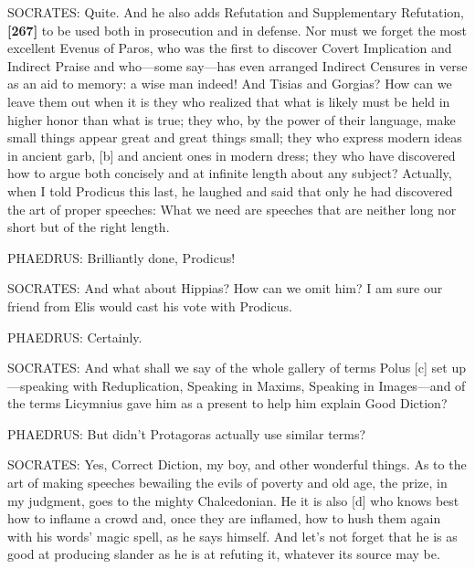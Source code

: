 SOCRATES: Quite. And he also adds Refutation and Supplementary
Refutation, {\bf {[}267{]}} to be used both in prosecution and in
defense. Nor must we forget the most excellent Evenus of
Paros, who was the
first to discover Covert Implication and Indirect Praise and who---some
say---has even arranged Indirect Censures in verse as an aid to memory:
a wise man indeed! And
Tisias and Gorgias?
How can we leave them out when it is they who realized that what is
likely must be held in higher honor than what is true; they who, by the
power of their language, make small things appear great and great things
small; they who express modern ideas in ancient garb, {[}b{]} and
ancient ones in modern dress; they who have discovered how to argue both
concisely and at infinite length about any subject? Actually, when I
told Prodicus this
last, he laughed and said that only he had discovered the art of proper
speeches: What we need are speeches that are neither long nor short but
of the right length.

PHAEDRUS: Brilliantly done, Prodicus!

SOCRATES: And what about
Hippias? How can we
omit him? I am sure our friend from Elis would cast his vote with
Prodicus.

PHAEDRUS: Certainly.

SOCRATES: And what shall we say of the whole gallery of terms
Polus {[}c{]} set
up---speaking with Reduplication, Speaking in Maxims, Speaking in
Images---and of the terms Licymnius gave him as a present to help him
explain Good Diction?

PHAEDRUS: But didn't Protagoras actually use similar
terms?

SOCRATES: Yes, Correct Diction, my boy, and other wonderful things. As
to the art of making speeches bewailing the evils of poverty and old
age, the prize, in my judgment, goes to the mighty
Chalcedonian. He it is
also {[}d{]} who knows best how to inflame a crowd and, once they are
inflamed, how to hush them again with his words' magic spell, as he says
himself. And let's not forget that he is as good at producing slander as
he is at refuting it, whatever its source may be.


